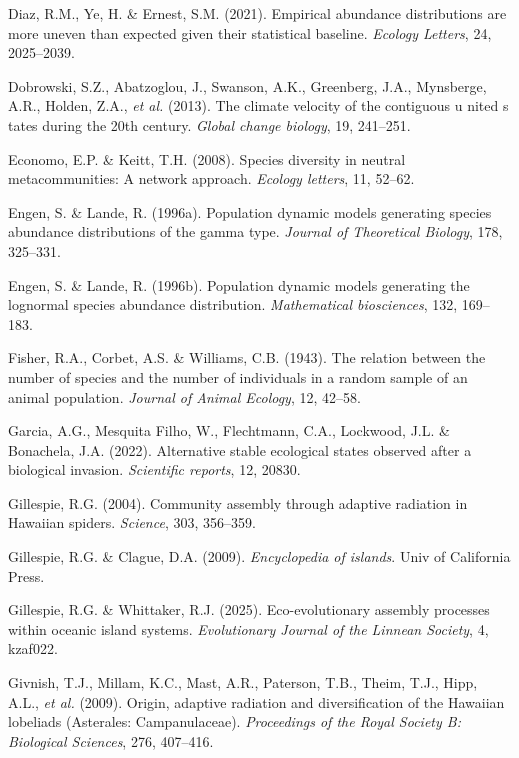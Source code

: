 \documentclass[
  letterpaper,
  DIV=11,
  numbers=noendperiod]{scrartcl}
\newlength{\cslhangindent}
\newenvironment{CSLReferences}[2] %
 {\begin{list}{}{%
  \setlength{\itemindent}{0pt}
  \setlength{\leftmargin}{0pt}
  \setlength{\parsep}{0pt}
  \ifodd #1
   \setlength{\leftmargin}{\cslhangindent}
   \setlength{\itemindent}{-1\cslhangindent}
  \fi
  \setlength{\itemsep}{#2\baselineskip}}}
 {\end{list}}
\begin{document}
\begin{CSLReferences}{1}{0}
Diaz, R.M., Ye, H. \& Ernest, S.M. (2021). Empirical abundance
distributions are more uneven than expected given their statistical
baseline. \emph{Ecology Letters}, 24, 2025--2039.

Dobrowski, S.Z., Abatzoglou, J., Swanson, A.K., Greenberg, J.A.,
Mynsberge, A.R., Holden, Z.A., \emph{et al.} (2013). The climate
velocity of the contiguous u nited s tates during the 20th century.
\emph{Global change biology}, 19, 241--251.

Economo, E.P. \& Keitt, T.H. (2008). Species diversity in neutral
metacommunities: A network approach. \emph{Ecology letters}, 11, 52--62.

Engen, S. \& Lande, R. (1996a). Population dynamic models generating
species abundance distributions of the gamma type. \emph{Journal of
Theoretical Biology}, 178, 325--331.

Engen, S. \& Lande, R. (1996b). Population dynamic models generating the
lognormal species abundance distribution. \emph{Mathematical
biosciences}, 132, 169--183.

Fisher, R.A., Corbet, A.S. \& Williams, C.B. (1943). The relation
between the number of species and the number of individuals in a random
sample of an animal population. \emph{Journal of Animal Ecology}, 12,
42--58.

Garcia, A.G., Mesquita Filho, W., Flechtmann, C.A., Lockwood, J.L. \&
Bonachela, J.A. (2022). Alternative stable ecological states observed
after a biological invasion. \emph{Scientific reports}, 12, 20830.

Gillespie, R.G. (2004). Community assembly through adaptive radiation in
{Hawaiian} spiders. \emph{Science}, 303, 356--359.

Gillespie, R.G. \& Clague, D.A. (2009). \emph{Encyclopedia of islands}.
Univ of California Press.

Gillespie, R.G. \& Whittaker, R.J. (2025). Eco-evolutionary assembly
processes within oceanic island systems. \emph{Evolutionary Journal of
the Linnean Society}, 4, kzaf022.

Givnish, T.J., Millam, K.C., Mast, A.R., Paterson, T.B., Theim, T.J.,
Hipp, A.L., \emph{et al.} (2009). Origin, adaptive radiation and
diversification of the {Hawaiian} lobeliads ({Asterales}:
{Campanulaceae}). \emph{Proceedings of the Royal Society B: Biological
Sciences}, 276, 407--416.


\end{CSLReferences}
\end{document}
